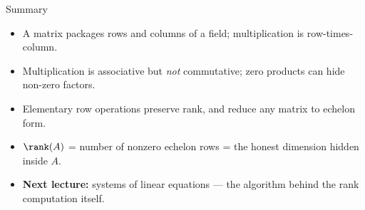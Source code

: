 \begin{frame}{Summary}
\begin{itemize}
\item A matrix packages rows and columns of a field; multiplication is row-times-column.
\pause
\item Multiplication is associative but \emph{not} commutative; zero products can hide non-zero factors.
\pause
\item Elementary row operations preserve rank, and reduce any matrix to echelon form.
\pause
\item $\rank(A)$ = number of nonzero echelon rows = the honest dimension hidden inside $A$.
\pause
\item \textbf{Next lecture:} systems of linear equations — the algorithm behind the rank computation itself.
\end{itemize}
\end{frame}
